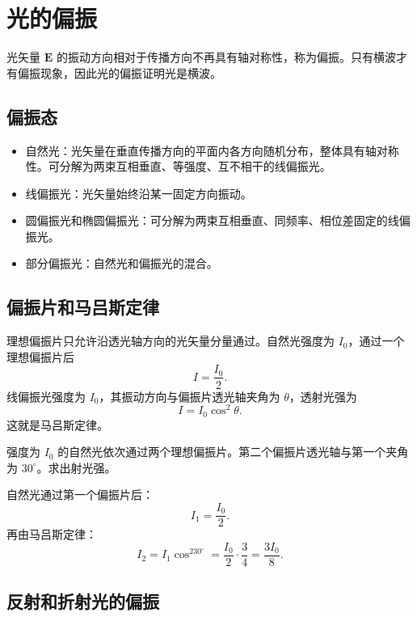 \section{光的偏振}

\begin{definition}[偏振现象]\label{def:polarization}
光矢量 $\bm E$ 的振动方向相对于传播方向不再具有轴对称性，称为偏振。只有横波才有偏振现象，因此光的偏振证明光是横波。
\end{definition}

\subsection*{偏振态}

\begin{itemize}
  \item 自然光：光矢量在垂直传播方向的平面内各方向随机分布，整体具有轴对称性。可分解为两束互相垂直、等强度、互不相干的线偏振光。
  \item 线偏振光：光矢量始终沿某一固定方向振动。
  \item 圆偏振光和椭圆偏振光：可分解为两束互相垂直、同频率、相位差固定的线偏振光。
  \item 部分偏振光：自然光和偏振光的混合。
\end{itemize}

\subsection*{偏振片和马吕斯定律}

理想偏振片只允许沿透光轴方向的光矢量分量通过。自然光强度为 $I_0$，通过一个理想偏振片后
\[
  I=\frac{I_0}{2}.
\]
线偏振光强度为 $I_0$，其振动方向与偏振片透光轴夹角为 $\theta$，透射光强为
\[
  I=I_0\cos^2\theta.
\]
这就是马吕斯定律。

\begin{example}[title={两个偏振片}]\label{eg:malus-example}
强度为 $I_0$ 的自然光依次通过两个理想偏振片。第二个偏振片透光轴与第一个夹角为 $30^\circ$。求出射光强。

\begin{solution}
自然光通过第一个偏振片后：
\[
  I_1=\frac{I_0}{2}.
\]
再由马吕斯定律：
\[
  I_2=I_1\cos^230^\circ
  =\frac{I_0}{2}\cdot\frac34
  =\frac{3I_0}{8}.
\]
\end{solution}
\end{example}

\subsection*{反射和折射光的偏振}

